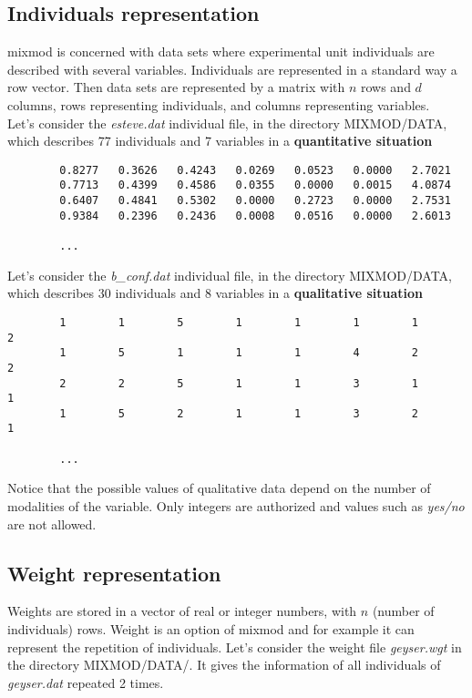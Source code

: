 \subsection{Individuals representation} \label{individualsRepresentationSection}
{\sc mixmod} is concerned with data sets where experimental unit
individuals are described with several variables. Individuals are
represented in a standard way a row vector. Then data sets are
represented by a matrix with $n$ rows and $d$ columns, rows representing individuals, and columns representing variables.\\
Let's consider the {\it esteve.dat} individual file, in the directory MIXMOD/DATA, which describes 77 individuals and 7
variables in a \textbf{quantitative situation}

{\scriptsize
\begin{verbatim}
        0.8277   0.3626   0.4243   0.0269   0.0523   0.0000   2.7021
        0.7713   0.4399   0.4586   0.0355   0.0000   0.0015   4.0874
        0.6407   0.4841   0.5302   0.0000   0.2723   0.0000   2.7531
        0.9384   0.2396   0.2436   0.0008   0.0516   0.0000   2.6013

        ...
\end{verbatim}}


Let's consider the {\it b\_conf.dat} individual file, in the directory MIXMOD/DATA, which describes 30 individuals and 8
variables in a \textbf{qualitative situation}

{\scriptsize
 \begin{verbatim}
        1        1        5        1        1        1        1        2
        1        5        1        1        1        4        2        2
        2        2        5        1        1        3        1        1
        1        5        2        1        1        3        2        1

        ...
 \end{verbatim}
}


Notice that the possible values of qualitative data depend on the number of modalities of the variable.
Only integers are authorized and values such as \textit{yes/no} are not allowed.

\subsection{Weight representation}
Weights are stored in a vector of real or integer numbers, with $n$ (number of individuals) rows.
Weight is an option of {\sc mixmod} and for example it can represent the repetition of individuals.
Let's consider the weight file {\it geyser.wgt} in the directory MIXMOD/DATA/. It gives the information of all
individuals of {\it geyser.dat} repeated 2 times.\\

